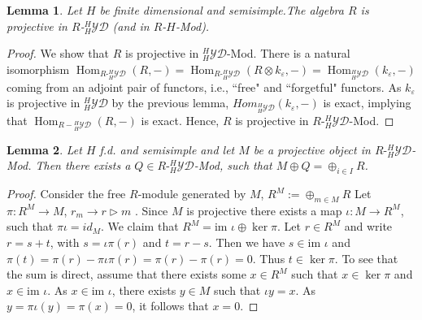 \documentclass{amsart}
\newtheorem{lemma}{Lemma}
\theoremstyle{definition}
\newcommand{\YD}[1]{\ensuremath{{}^{#1}_{#1}\mathcal{YD}}}
\DeclareMathOperator{\Hom}{Hom}
\begin{document}
	\begin{lemma}
		Let $H$ be finite dimensional and semisimple.The algebra $R$ is projective in $R$-$\YD H$ (and in $R$-$H$-Mod).
	\end{lemma}
	\begin{proof}
		We show that $R$ is projective in $\YD H$-Mod.
		There is a natural isomorphism 
		$\Hom_{R\text{-}\YD H}(R, -) = \Hom_{R\text{-}\YD H}(R\otimes k_\varepsilon, -) = \Hom_{\YD H}(k_\varepsilon, -)$ coming from an adjoint pair of functors, i.e., ``free" and ``forgetful" functors.
		As $k_\varepsilon$ is projective in $\YD H$ by the previous lemma,  $Hom_{\YD H}(k_\varepsilon, -)$ is exact, implying that $\Hom_{R-\YD H}(R, -)$ is exact. Hence, $R$ is projective in {{$R\text{-}\YD H$-Mod}}.
	\end{proof}
	
	\begin{lemma}
		Let $H$ f.d. and semisimple and let $M$ be a projective object in $R\text{-}\YD H$-Mod. Then there exists a $Q\in R\text{-}\YD H$-Mod, such that $M \oplus Q  = \oplus_{i \in I} R$.
	\end{lemma}
	\begin{proof}
		Consider the free $R$-module generated by $M$, $R^M:= \oplus_{m \in M} R$
		Let $\pi: R^M \rightarrow M$, $r_m \rightarrow r\triangleright m$ . Since $M$ is projective there exists a map $\iota: M \rightarrow R^M$, such that $\pi \iota  = id_M$.
		We claim that $R^M = \text{im } \iota \oplus \ker \pi$.
		Let $r \in R^M$ and write $r= s + t$, with $s= \iota \pi (r)$ and $t= r-s$.  Then we have $s \in \text{im } \iota$ and $\pi(t) = \pi(r) - \pi \iota \pi(r)= \pi(r) -\pi(r) = 0$. Thus $t \in \ker \pi$.
		To see that the sum is direct, assume that there exists some $x \in R^M$ such that $x\in \ker \pi$ and $x \in \text{im } \iota$.  As $x \in \text{im } \iota$, there exists $y \in M $ such that $\iota y= x$.
		As $y= \pi\iota (y) = \pi(x) =0$, it follows that $x=0$.
	\end{proof}
	
\end{document}
